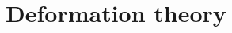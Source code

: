 \chapter{Deformation theory}
    \begin{abstract}
        
    \end{abstract}
    
    \minitoc
    
    
    
    